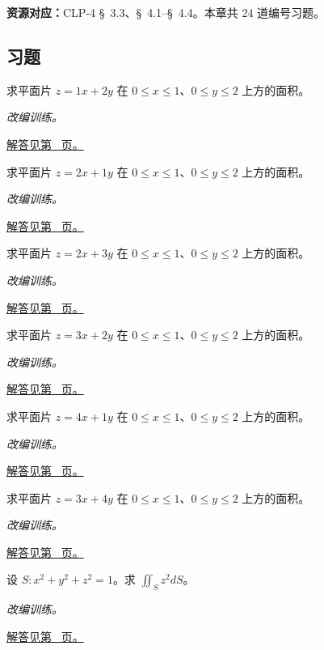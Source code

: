 \documentclass[UTF8,12pt,a4paper,fontset=fandol]{ctexart}
\begin{document}
\textbf{资源对应：}CLP-4 \S~3.3、\S~4.1--\S~4.4。本章共 24 道编号习题。
\subsection{习题}
\begin{example}[图形曲面的面积]\label{ex:c43q1}
求平面片 $z=1x+2y$ 在 $0\le x\le1$、$0\le y\le2$ 上方的面积。
\par\textit{改编训练。}\par\hyperref[ans:c43q1]{解答见第~\pageref{ans:c43q1} 页。}
\end{example}
\begin{example}[图形曲面的面积]\label{ex:c43q2}
求平面片 $z=2x+1y$ 在 $0\le x\le1$、$0\le y\le2$ 上方的面积。
\par\textit{改编训练。}\par\hyperref[ans:c43q2]{解答见第~\pageref{ans:c43q2} 页。}
\end{example}
\begin{example}[图形曲面的面积]\label{ex:c43q3}
求平面片 $z=2x+3y$ 在 $0\le x\le1$、$0\le y\le2$ 上方的面积。
\par\textit{改编训练。}\par\hyperref[ans:c43q3]{解答见第~\pageref{ans:c43q3} 页。}
\end{example}
\begin{example}[图形曲面的面积]\label{ex:c43q4}
求平面片 $z=3x+2y$ 在 $0\le x\le1$、$0\le y\le2$ 上方的面积。
\par\textit{改编训练。}\par\hyperref[ans:c43q4]{解答见第~\pageref{ans:c43q4} 页。}
\end{example}
\begin{example}[图形曲面的面积]\label{ex:c43q5}
求平面片 $z=4x+1y$ 在 $0\le x\le1$、$0\le y\le2$ 上方的面积。
\par\textit{改编训练。}\par\hyperref[ans:c43q5]{解答见第~\pageref{ans:c43q5} 页。}
\end{example}
\begin{example}[图形曲面的面积]\label{ex:c43q6}
求平面片 $z=3x+4y$ 在 $0\le x\le1$、$0\le y\le2$ 上方的面积。
\par\textit{改编训练。}\par\hyperref[ans:c43q6]{解答见第~\pageref{ans:c43q6} 页。}
\end{example}
\begin{example}[球面的二次函数积分]\label{ex:c43q7}
设 $S:x^2+y^2+z^2=1$。求 $\displaystyle\iint_Sz^2dS$。
\par\textit{改编训练。}\par\hyperref[ans:c43q7]{解答见第~\pageref{ans:c43q7} 页。}
\end{example}
\end{document}
